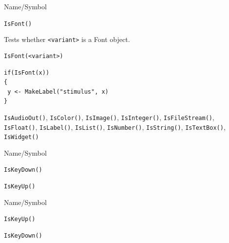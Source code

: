 \begin{desc}{Name/Symbol}
\item[Name/Symbol]	\verb+IsFont()+

\item[Description]	Tests whether \verb+<variant>+ is a Font object.

\item[Usage]
\begin{verbatim}
IsFont(<variant>)
\end{verbatim}

\item[Example]	
\begin{verbatim}
if(IsFont(x))
{
 y <- MakeLabel("stimulus", x)
}
\end{verbatim}

\item[See Also] \verb+IsAudioOut()+, \verb+IsColor()+,
  \verb+IsImage()+, \verb+IsInteger()+, \verb+IsFileStream()+,
  \verb+IsFloat()+, \verb+IsLabel()+, \verb+IsList()+,
  \verb+IsNumber()+, \verb+IsString()+, \verb+IsTextBox()+,
  \verb+IsWidget()+
\end{desc}



\begin{desc}{Name/Symbol}
\item[Name/Symbol]	\verb+IsKeyDown()+

\item[Description]	

\item[Usage]		

\item[Example]	

\item[See Also]	\verb+IsKeyUp()+
\end{desc}

\begin{desc}{Name/Symbol}
\item[Name/Symbol]	\verb+IsKeyUp()+

\item[Description]	

\item[Usage]		

\item[Example]	

\item[See Also]	\verb+IsKeyDown()+
\end{desc}

